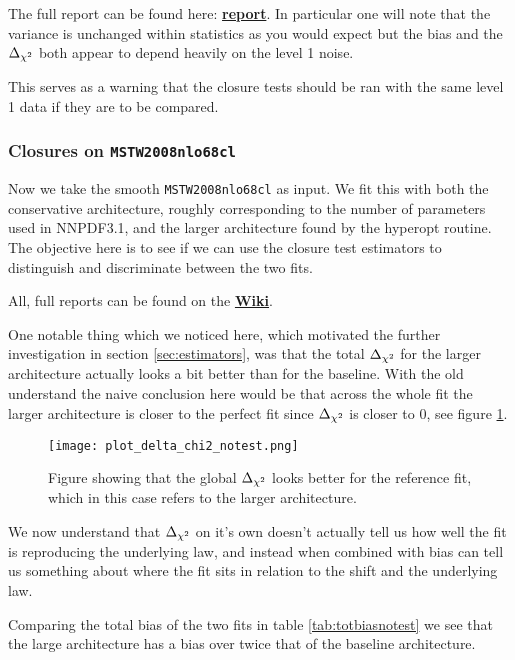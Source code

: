 The full report can be found here:
\href{https://vp.nnpdf.science/mbcTUd6-TQmQFvaGd37bkg==}{\bf{report}}. In particular
one will note that the variance is unchanged within statistics as you would expect
but the bias and the $\Delta_{\chi^{2}}$ both appear to depend heavily on the level 1 noise.

This serves as a warning that the closure tests should be ran with the same level
1 data if they are to be compared.


\subsubsection*{Closures on \texttt{MSTW2008nlo68cl}}

Now we take the smooth \texttt{MSTW2008nlo68cl} as input. We fit this
with both the conservative architecture, roughly corresponding to the number of
parameters used in NNPDF3.1, and the larger architecture found by the hyperopt
routine. The objective here is to see if we can use the closure test estimators
to distinguish and discriminate between the two fits.

All, full reports can be found on the
\href{https://www.wiki.ed.ac.uk/display/nnpdfwiki/n3fit+closure+results}{\bf{Wiki}}.

One notable thing which we noticed here, which motivated the further investigation
in section \ref{sec:estimators}, was that the total $\Delta_{\chi^{2}}$ for the larger architecture
actually looks a bit better than for the baseline. With the old understand
the naive conclusion here would be that across the whole fit the larger architecture
is closer to the perfect fit since $\Delta_{\chi^{2}}$ is closer to 0, see figure \ref{fig:no_test_dcs}.

\begin{figure}[!h]
    \centering
    \texttt{[image: plot\_delta\_chi2\_notest.png]}
    \caption{
        Figure showing that the global $\Delta_{\chi^{2}}$ looks better for the reference
        fit, which in this case refers to the larger architecture.
        }
    \label{fig:no_test_dcs}
\end{figure}

We now understand that $\Delta_{\chi^{2}}$ on it's own doesn't actually tell us how well
the fit is reproducing the underlying law, and instead when combined with bias
can tell us something about where the fit sits in relation to the shift and the
underlying law.

Comparing the total bias of the two fits in table \ref{tab:totbiasnotest} we
see that the large architecture has a bias over twice that of the baseline architecture.

